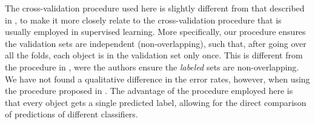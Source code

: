 \documentclass[twoside]{memoir}\usepackage[]{graphicx}\usepackage{xcolor}
\begin{document}
The cross-validation procedure used here is slightly different from that described in \citep{Chapelle2006}, to make it more closely relate to the cross-validation procedure that is usually employed in supervised learning. More specifically, our procedure ensures the validation sets are independent (non-overlapping), such that, after going over all the folds, each object is in the validation set only once. This is different from the procedure in \citep{Chapelle2006}, were the authors ensure the \emph{labeled} sets are non-overlapping. We have not found a qualitative difference in the error rates, however, when using the procedure proposed in \citep{Chapelle2006}. The advantage of the procedure employed here is that every object gets a single predicted label, allowing for the direct comparison of predictions of different classifiers.
\end{document}

